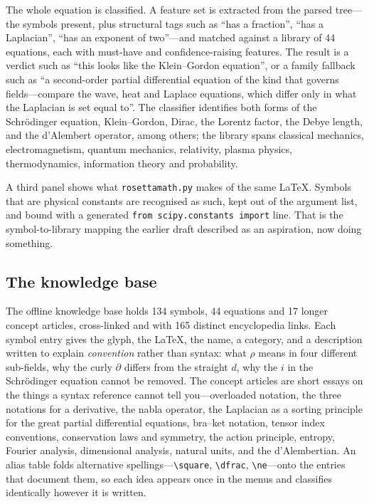 \documentclass[11pt]{article}
\begin{document}
The whole equation is classified. A feature set is extracted from the parsed
tree---the symbols present, plus structural tags such as ``has a fraction'',
``has a Laplacian'', ``has an exponent of two''---and matched against a library
of 44 equations, each with must-have and confidence-raising features. The
result is a verdict such as ``this looks like the Klein--Gordon equation'', or a
family fallback such as ``a second-order partial differential equation of the
kind that governs fields---compare the wave, heat and Laplace equations, which
differ only in what the Laplacian is set equal to''. The classifier identifies
both forms of the Schr\"odinger equation, Klein--Gordon, Dirac, the Lorentz
factor, the Debye length, and the d'Alembert operator, among others; the
library spans classical mechanics, electromagnetism, quantum mechanics,
relativity, plasma physics, thermodynamics, information theory and probability.

A third panel shows what \texttt{rosettamath.py} makes of the same \LaTeX{}.
Symbols that are physical constants are recognised as such, kept out of the
argument list, and bound with a generated \verb|from scipy.constants import|
line. That is the symbol-to-library mapping the earlier draft described as an
aspiration, now doing something.

\subsection{The knowledge base}

The offline knowledge base holds 134 symbols, 44 equations and 17 longer
concept articles, cross-linked and with 165 distinct encyclopedia links. Each
symbol entry gives the glyph, the \LaTeX{}, the name, a category, and a
description written to explain \emph{convention} rather than syntax: what
$\rho$ means in four different sub-fields, why the curly $\partial$ differs
from the straight $d$, why the $i$ in the Schr\"odinger equation cannot be
removed. The concept articles are short essays on the things a syntax
reference cannot tell you---overloaded notation, the three notations for a
derivative, the nabla operator, the Laplacian as a sorting principle for the
great partial differential equations, bra--ket notation, tensor index
conventions, conservation laws and symmetry, the action principle, entropy,
Fourier analysis, dimensional analysis, natural units, and the d'Alembertian.
An alias table folds alternative spellings---\verb|\square|, \verb|\dfrac|,
\verb|\ne|---onto the entries that document them, so each idea appears once in
the menus and classifies identically however it is written.
\end{document}
